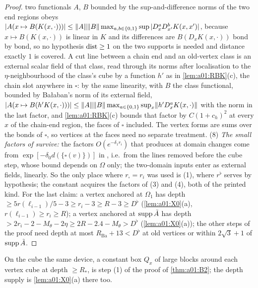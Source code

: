 \begin{proof}
two functionals $A$, $B$ bounded by the sup-and-difference norms of the two end regions obeys $|A(x\mapsto B(K(x,\cdot)))|\le\lVert A\rVert\lVert B\rVert\max_{a,b\in\{0,1\}}\sup|D^a_xD^b_{x'}K(x,x')|$, because $x\mapsto B(K(x,\cdot))$ is linear in $K$ and its differences are $B(D_xK(x,\cdot))$ bond by bond, so no hypothesis $\operatorname{dist}\ge1$ on the two supports is needed and distance exactly $1$ is covered. A cut line between a chain end and an old-vertex class is an external scalar field of that class, read through its norms \cite[(3.3)]{Ba3} after localisation to the $\eta$-neighbourhood of the class's cube by a function $h'$ as in \cref{lem:a01:RBK}(c), the chain slot anywhere in $\square$: by the same linearity, with $B$ the class functional, bounded by Ba{\l}aban's norm \cite[(1.32)]{Ba3} of its external field, $|A(x\mapsto B(h'K(x,\cdot)))|\le\lVert A\rVert\lVert B\rVert\max_{a\in\{0,1\}}\sup_x\lVert h'D^a_xK(x,\cdot)\rVert$ with the norm \cite[(1.32)]{Ba3} in the last factor, and \cref{lem:a01:RBK}(c) bounds that factor by $C(1+c_h)^2$ at every $x$ of the chain-end region, the faces of $\square$ included. The vertex forms are sums over the bonds of $\square$, so vertices at the faces need no separate treatment. (8) \emph{The small factors of \cite{Ba2} survive:} the factors $O(e^{-\delta_1r_i})$ that \cite[p.~422]{Ba3} produces at domain changes come from $\exp[-\delta_0d(\{\square(v)\})]$ in \cite[(1.33)]{Ba3}, i.e.\ from the lines removed before the cube step, whose bound depends on $\Omega$ only; the two-domain inputs enter as external fields, linearly. So the only place where $r_\square=r_i$ was used is (1), where $r^\flat$ serves by hypothesis; the constant acquires the factors of (3) and (4), both of the printed kind. For the last claim: a vertex anchored at $\Omega_1$ has depth $\ge5r(\ell_{i-1})/5-3\ge r_i-3\ge R-3\ge D^\flat$ (\cref{lem:a01:X0}(a), $r(\ell_{i-1})\ge r_i\ge R$); a vertex anchored at $\operatorname{supp}\tilde A$ has depth $>2r_i-2-M_\theta-2\eta\ge2R-2.4-M_\theta>D^\flat$ (\cref{lem:a01:X0}(a)); the other steps of the proof need depth at most $R_{\mathrm{Ba}}+13<D^\flat$ at old vertices or within $2\sqrt3+1$ of $\operatorname{supp}\tilde A$.
\end{proof}

On the cube the same device, a constant box $Q_x$ of large blocks around each vertex cube at depth $\ge R_*$, is step (1) of the proof of \cref{thm:a01:B2}; the depth supply is \cref{lem:a01:X0}(a) there too.

